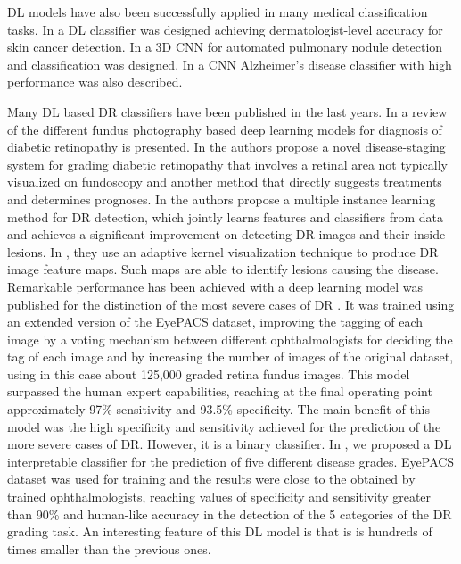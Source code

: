 \documentclass[review]{elsarticle}
\theoremstyle{definition} %
\theoremstyle{remark}
\begin{document}
DL models have also been successfully applied in many medical classification tasks. In \cite{esteva2017dermatologist} a DL classifier was designed achieving dermatologist-level accuracy for skin cancer detection. In \cite{wentao2018deeplung} a 3D CNN for automated pulmonary nodule detection and classification was designed. In \cite{wang2018classification} a CNN Alzheimer's disease classifier with high performance was also described. 

Many DL based DR classifiers have been published in the last years. 
In \cite{raman2018fundus} a review of the different fundus photography based deep learning models for diagnosis of diabetic retinopathy is presented. In \cite{takahashi2017applying} the authors propose a novel disease-staging system for grading diabetic retinopathy that involves a retinal area not typically visualized on fundoscopy and another method that directly suggests treatments and determines prognoses. In \cite{zhou2017deep} the authors propose a multiple instance learning method for DR detection, which jointly learns features and classifiers from data and achieves a significant improvement on detecting DR images and their inside lesions. In \cite{keel2019visualizing}, they use an adaptive kernel visualization technique to produce DR image feature maps. Such maps are able to identify lesions causing the disease. 
Remarkable performance has been achieved with a deep learning model was published for the distinction of the most severe cases of DR \cite{doi:10.1001/jama.2016.17216}. It was trained using an extended version of the EyePACS dataset, improving the tagging of each image by a voting mechanism between different ophthalmologists for deciding the tag of each image and by increasing the number of images of the original dataset, using in this case about 125,000 graded retina fundus images. This model surpassed the human expert capabilities, reaching at the final operating point approximately  97\% sensitivity and 93.5\% specificity. The main benefit of this model was the high specificity and sensitivity achieved for the prediction of the more severe cases of DR. However, it is a binary classifier. In \cite{de2017deep}, we proposed a DL interpretable classifier for the prediction of five different disease grades. EyePACS dataset was used for training and the results were close to the obtained by trained ophthalmologists, reaching values of specificity and sensitivity greater than 90\% and human-like accuracy in the detection of the 5 categories of the DR grading task. An interesting feature of this DL model is that is is hundreds of times smaller than the previous ones.
\end{document}

